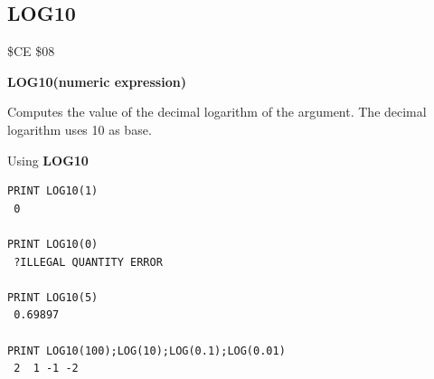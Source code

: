 
\newpage
\subsection{LOG10}
\begin{description}[leftmargin=2cm,style=nextline]
\item [Token:] \$CE \$08
\item [Format:] {\bf LOG10(numeric expression)}
\item [Usage:] Computes
               the value of the decimal logarithm of the argument.
               The decimal logarithm uses 10 as base.

\item [Example:] Using {\bf LOG10}
\begin{tcolorbox}[colback=black,coltext=white]
\verbatimfont{\codefont}
\begin{verbatim}
PRINT LOG10(1)
 0

PRINT LOG10(0)
 ?ILLEGAL QUANTITY ERROR

PRINT LOG10(5)
 0.69897

PRINT LOG10(100);LOG(10);LOG(0.1);LOG(0.01)
 2  1 -1 -2
\end{verbatim}
\end{tcolorbox}
\end{description}


\newpage
